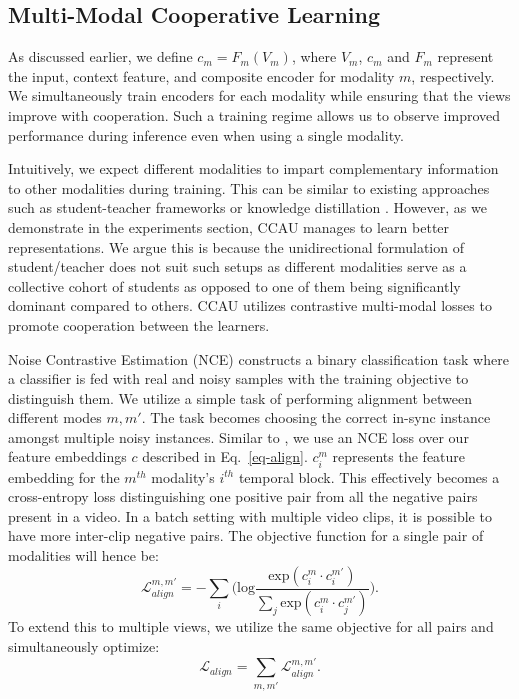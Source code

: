\documentclass[final]{cvpr}
\begin{document}
\subsection{Multi-Modal Cooperative Learning}

As discussed earlier, we define $c_{m} = F_m(V_m)$, where $V_m$, $c_m$ and $F_m$ represent the input, context feature, and composite encoder for modality $m$, respectively. We simultaneously train encoders for each modality while ensuring that the views improve with cooperation. Such a training regime allows us to observe improved performance during inference even when using a single modality. 

Intuitively, we expect different modalities to impart complementary information to other modalities during training. This can be similar to existing approaches such as student-teacher frameworks or knowledge distillation \cite{hinton2015distilling, kong2019mmact}. However, as we demonstrate in the experiments section, CCAU manages to learn better representations. We argue this is because the unidirectional formulation of student/teacher does not suit such setups as different modalities serve as a collective cohort of students as opposed to one of them being significantly dominant compared to others. CCAU utilizes contrastive multi-modal losses to promote cooperation between the learners.

Noise Contrastive Estimation (NCE) \cite{gutmann2010noise, mnih2013learning, oord2018representation} constructs a binary classification task where a classifier is fed with real and noisy samples with the training objective to distinguish them. We utilize a simple task of performing alignment between different modes $m, m'$. The task becomes choosing the correct in-sync instance amongst multiple noisy instances. Similar to \cite{cmc}, we use an NCE loss over our feature embeddings $c$ described in Eq.~\eqref{eq-align}. $c^{m}_{i}$ represents the feature embedding for the $m^{th}$ modality's $i^{th}$ temporal block. This effectively becomes a cross-entropy loss distinguishing one positive pair from all the negative pairs present in a video. In a batch setting with multiple video clips, it is possible to have more inter-clip negative pairs.  The objective function for a single pair of modalities will hence be:
{\small \begin{equation}
    \label{eq-align}
    \mathcal{L}^{m, m'}_{align} = - \sum_{i} \bigg( \text{log} \frac{\text{exp}({c}^{m}_{i} \cdot c^{m'}_{i})}{\sum_{j} \text{exp}({c}^{m}_{i} \cdot c^{m'}_{j})} \bigg).
\end{equation}}
To extend this to multiple views, we utilize the same objective for all pairs and simultaneously optimize: 
$$\mathcal{L}_{align} = \sum_{m, m'} \mathcal{L}^{m, m'}_{align}.$$ 
\end{document}
